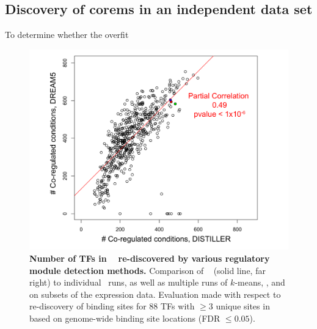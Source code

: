 \subsection{Discovery of corems in an independent data set}

To determine whether the overfit 

\begin{figure}[h!]
\centering
\includegraphics[width=0.75\linewidth]{figures/corem_conds_distiller_dream5.pdf}
\caption[Number of TFs in \rdb~ re-discovered by various
    regulatory module detection methods.]  {{\bf Number of TFs in
    \rdb~ re-discovered by various regulatory module detection
    methods.} Comparison of \egrine~ (solid line, far right) to
  individual \cm\ runs, as well as multiple runs of $k$-means,
  , and  on subsets of the expression
  data. Evaluation made with respect to re-discovery of binding sites
  for 88 TFs with $\geq 3$ unique sites in \rdb~ based on genome-wide
  binding site locations (FDR $\leq 0.05$).}
\label{fig:corem_conds_distiller_dream5}
\end{figure}

